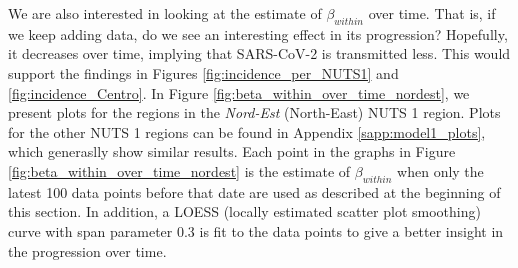 \documentclass[12pt]{article}
\begin{document}
	We are also interested in looking at the estimate of $\beta_{within}$ over time. That is, if we keep adding data, do we see an interesting effect in its progression? Hopefully, it decreases over time, implying that SARS-CoV-2 is transmitted less. This would support the findings in Figures \ref{fig:incidence_per_NUTS1} and \ref{fig:incidence_Centro}. In Figure \ref{fig:beta_within_over_time_nordest}, we present plots for the regions in the \textit{Nord-Est} (North-East) NUTS 1 region. Plots for the other NUTS 1 regions can be found in Appendix \ref{sapp:model1_plots}, which generaslly show similar results. Each point in the graphs in Figure \ref{fig:beta_within_over_time_nordest} is the estimate of $\beta_{within}$ when only the latest 100 data points before that date are used as described at the beginning of this section. In addition, a LOESS (locally estimated scatter plot smoothing) curve with span parameter 0.3 is fit to the data points to give a better insight in the progression over time. \\
	
\end{document}
